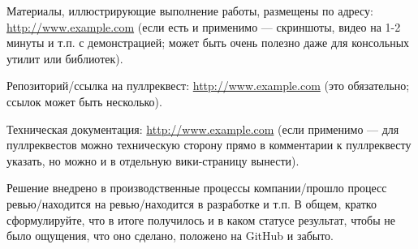 \documentclass[a4paper]{article}
\begin{document}
Материалы, иллюстрирующие выполнение работы, размещены по адресу: \url{http://www.example.com} (если есть и применимо --- скриншоты, видео на 1-2 минуты и т.п. с демонстрацией; может быть очень полезно даже для консольных утилит или библиотек).

Репозиторий/ссылка на пуллреквест: \url{http://www.example.com} (это обязательно; ссылок может быть несколько).

Техническая документация: \url{http://www.example.com} (если применимо --- для пуллреквестов можно техническую сторону прямо в комментарии к пуллреквесту указать, но можно и в отдельную вики-страницу вынести).

Решение внедрено в производственные процессы компании/прошло процесс ревью/находится на ревью/находится в разработке и т.п. В общем, кратко сформулируйте, что в итоге получилось и в каком статусе результат, чтобы не было ощущения, что оно сделано, положено на GitHub и забыто.
\end{document}
